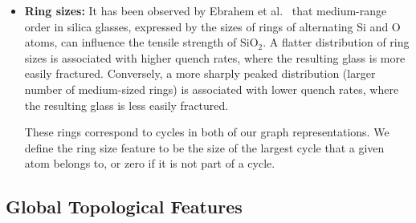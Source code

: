 \begin{itemize}
    \item\textbf{Ring sizes:} It has been observed by Ebrahem et al.~\cite{ebrahem2018influence} that medium-range order in silica glasses, expressed by the sizes of rings of alternating Si and O atoms, can influence the tensile strength of SiO$_2$. A flatter distribution of ring sizes is associated with higher quench rates, where the resulting glass is more easily fractured.  Conversely, a more sharply peaked distribution (larger number of medium-sized rings) is associated with lower quench rates, where the resulting glass is less easily fractured.
    
    These rings correspond to cycles in both of our graph representations.  We define the ring size feature to be the size of the largest cycle that a given atom belongs to, or zero if it is not part of a cycle.
    
    
\end{itemize}

\subsection{Global Topological Features}

